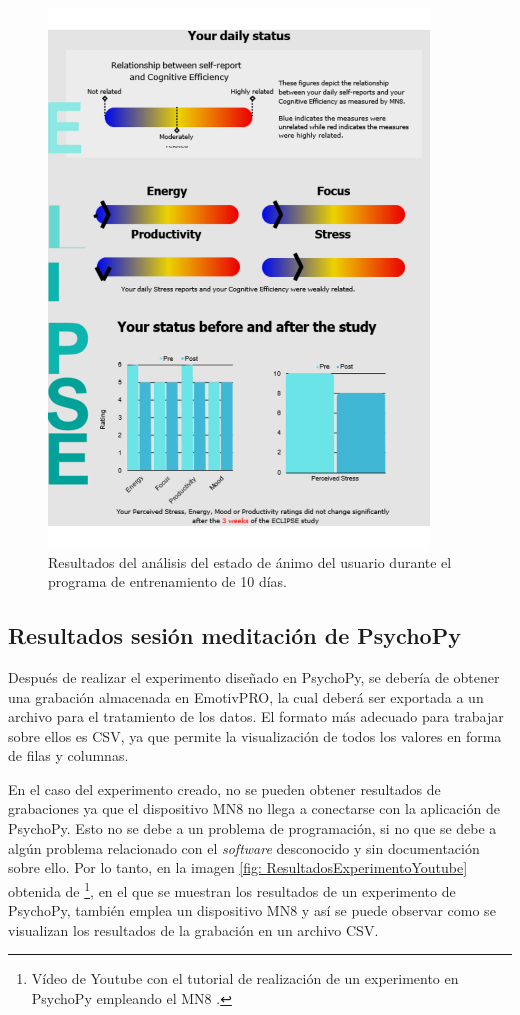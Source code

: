 \begin{figure}[H]
    \centering
    \includegraphics[width=0.9\textwidth]{img/ContourDailyStatus.pdf}
    \caption{Resultados del análisis del estado de ánimo del usuario durante el programa de entrenamiento de 10 días.}
    \label{fig: ContourDailyStatus}
    \end{figure}

\subsection{Resultados sesión meditación de PsychoPy}

Después de realizar el experimento diseñado en PsychoPy, se debería de obtener una grabación almacenada en EmotivPRO, la cual deberá ser exportada a un archivo para el tratamiento de los datos. El formato más adecuado para trabajar sobre ellos es CSV, ya que permite la visualización de todos los valores en forma de filas y columnas.

En el caso del experimento creado, no se pueden obtener resultados de grabaciones ya que el dispositivo MN8 no llega a conectarse con la aplicación de PsychoPy. Esto no se debe a un problema de programación, si no que se debe a algún problema relacionado con el \textit{software} desconocido y sin documentación sobre ello. Por lo tanto, en la imagen \ref{fig: ResultadosExperimentoYoutube} obtenida de \cite{VideoExperimentoMN8PsychoPy}\footnote{Vídeo de Youtube con el tutorial de realización de un experimento en PsychoPy empleando el MN8 \cite{VideoExperimentoMN8PsychoPy}.}, en el que se muestran los resultados de un experimento de PsychoPy, también emplea un dispositivo MN8 y así se puede observar como se visualizan los resultados de la grabación en un archivo CSV.

